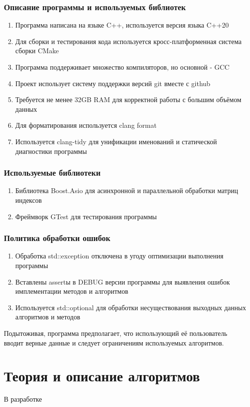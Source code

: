 \documentclass{article}
\begin{document}
\subsubsection{Описание программы и используемых библиотек}
\begin{enumerate}
  \item Программа написана на языке C++, используется версия языка C++20
  \item Для сборки и тестирования кода используется кросс-платформенная система сборки CMake
  \item Программа поддерживает множество компиляторов, но основной - GCC
  \item Проект использует систему поддержки версий git вместе с github
  \item Требуется не менее 32GB RAM для корректной работы с большим объёмом данных
  \item Для форматирования используется clang format
  \item Используется clang-tidy для унификации именований и статической диагностики программы
\end{enumerate}
\subsubsection{Используемые библиотеки}
\begin{enumerate}
  \item Библиотека Boost.Asio для асинхронной и параллельной обработки матриц индексов \cite{boostasio}
  \item Фреймворк GTest для тестирования программы \cite{googletest}
\end{enumerate}
\subsubsection{Политика обработки ошибок}
\begin{enumerate}
  \item Обработка std::exception отключена в угоду оптимизации выполнения программы
  \item Вставлены assertы в DEBUG версии программы для выявления ошибок имплементации методов и алгоритмов
  \item Используется std::optional для обработки несуществования выходных данных алгоритмов и методов
\end{enumerate}
Подытоживая, программа предполагает, что использующий её пользователь вводит верные данные и следует ограничениям используемых алгоритмов.
\section{Теория и описание алгоритмов}
В разработке
\end{document}
